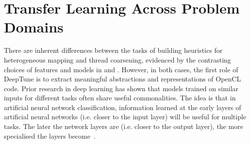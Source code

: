 \section{Transfer Learning Across Problem Domains}
\label{sec:deeptune-transfer-learning}

There are inherent differences between the tasks of building heuristics for heterogeneous mapping and thread coarsening, evidenced by the contrasting choices of features and models in \citeauthor{Grewe2013} and \citeauthor{Magni2014}. However, in both cases, the first role of DeepTune is to extract meaningful abstractions and representations of OpenCL code. Prior research in deep learning has shown that models trained on similar inputs for different tasks often share useful commonalities. The idea is that in artificial neural network classification, information learned at the early layers of artificial neural networks (i.e. closer to the input layer) will be useful for multiple tasks. The later the network layers are (i.e. closer to the output layer), the more specialised the layers become~\cite{Zeiler2014}.

